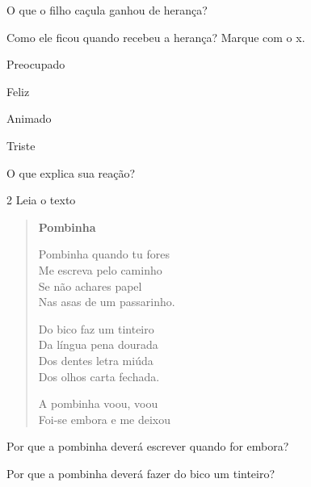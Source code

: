 \begin{escolha}
\item O que o filho caçula ganhou de herança?


\item Como ele ficou quando recebeu a herança? Marque com o x.

\begin{boxlist}
\boxitem[] Preocupado

\boxitem[] Feliz

\boxitem[] Animado

\boxitem[] Triste
\end{boxlist}

\item O que explica sua reação?

\end{escolha}

\num{2} Leia o texto

\begin{verse}
\textbf{Pombinha}

Pombinha quando tu fores\\
Me escreva pelo caminho\\
Se não achares papel\\
Nas asas de um passarinho.

Do bico faz um tinteiro\\
Da língua pena dourada\\
Dos dentes letra miúda\\
Dos olhos carta fechada.

A pombinha voou, voou\\
Foi-se embora e me deixou
\end{verse}


\begin{escolha}
\item Por que a pombinha deverá escrever quando for embora?


\item Por que a pombinha deverá fazer do bico um tinteiro?

\end{escolha}

